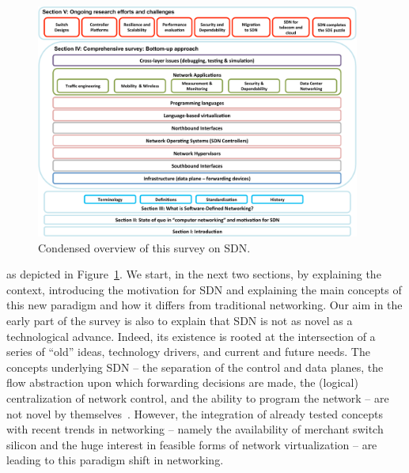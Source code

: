 \begin{figure}[t]
\centering
\includegraphics[width=0.95\textwidth]{figures/fig12_survey_condensed_overview.pdf}
\caption{Condensed overview of this survey on SDN.}
\label{fig:conclusion}
\end{figure}


 as depicted in Figure~\ref{fig:conclusion}.  We start, in the next two sections, by explaining the context,
introducing the motivation for SDN and explaining the main concepts
of this new paradigm and how it differs from traditional networking.
Our aim in the early part of the survey is also to explain that SDN 
is not as novel as a technological advance.  Indeed, its existence 
is rooted at the intersection of a series of ``old'' ideas, 
technology drivers, and current and future needs. The concepts underlying SDN -- the 
separation of the control and data planes, the  flow abstraction upon
which forwarding decisions are made, the (logical) centralization of
network control, and the ability 
to program the network -- are not novel by themselves~\cite{feamster2013-2}.
However, the integration of already tested concepts with recent trends 
in networking -- namely the availability of merchant switch silicon and
the huge interest in feasible forms of network virtualization -- are
leading to this paradigm shift in networking. 

